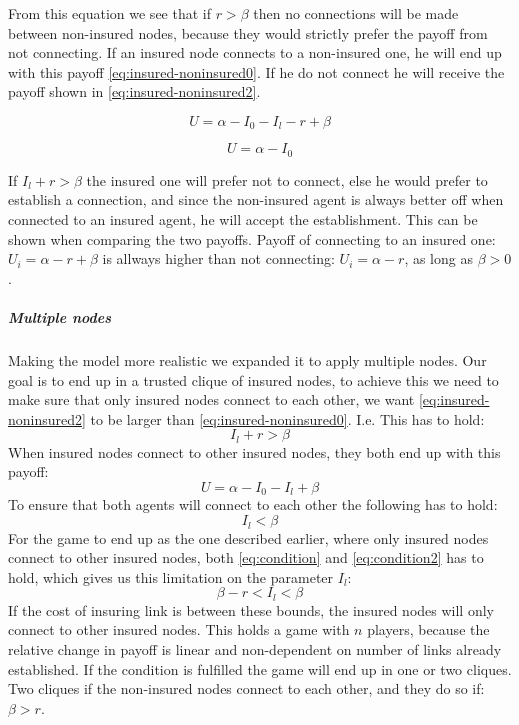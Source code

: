 From this equation we see that if $r>\beta$ then no connections will be made between non-insured nodes, because they would strictly prefer the payoff from not connecting.
If an insured node connects to a non-insured one, he will end up with this payoff \ref{eq:insured-noninsured0}. If he do not connect he will receive the payoff shown in \ref{eq:insured-noninsured2}.

\begin{equation}
U=\alpha - I_{0} - I_{l} - r + \beta
\label{eq:insured-noninsured0}
\end{equation}

\begin{equation}
U=\alpha - I_{0}
\label{eq:insured-noninsured2}
\end{equation}

If $I_{l}+r>\beta$ the insured one will prefer not to connect, else he would prefer to establish a connection, and since the non-insured agent is always better off when connected to an insured agent, he will accept the establishment. This can be shown when comparing the two payoffs. Payoff of connecting to an insured one: $U_{i}=\alpha - r + \beta$ is allways higher than not connecting: $U_{i}=\alpha - r$, as long as $\beta>0$.
\subparagraph{Multiple nodes}
Making the model more realistic we expanded it to apply multiple nodes. Our goal is to end up in a trusted clique of insured nodes, to achieve this we need to make sure that only insured nodes connect to each other, we want \ref{eq:insured-noninsured2} to be larger than \ref{eq:insured-noninsured0}. I.e. This has to hold:
\begin{equation}
I_{l}+r>\beta
\label{eq:condition}
\end{equation}
When insured nodes connect to other insured nodes, they both end up with this payoff:
\begin{equation}
U=\alpha - I_{0} - I_{l} + \beta
\label{eq:insured-insured}
\end{equation}
To ensure that both agents will connect to each other the following has to hold:
 \begin{equation}
I_{l}<\beta
\label{eq:condition2}
\end{equation}
For the game to end up as the one described earlier, where only insured nodes connect to other insured nodes, both \ref{eq:condition} and \ref{eq:condition2} has to hold, which gives us this limitation on the parameter $I_{l}$:
\begin{equation}
\beta-r<I_{l}<\beta
\label{eq:final condition}
\end{equation}
If the cost of insuring link is between these bounds, the insured nodes will only connect to other insured nodes. This holds a game with $n$ players, because the relative change in payoff is linear and non-dependent on number of links already established. 
If the condition is fulfilled the game will end up in one or two cliques. Two cliques if the non-insured nodes connect to each other, and they do so if: $\beta>r$. 

